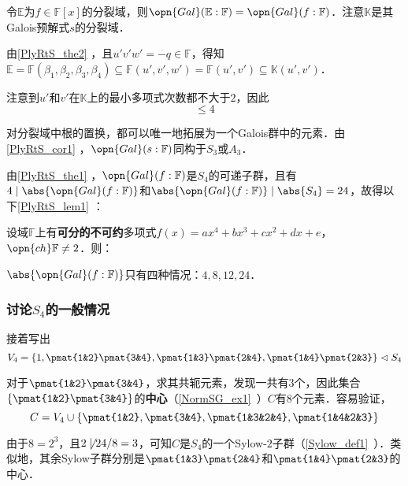 令$\mathbb{E}$为$f\in\mathbb{F}[x]$的分裂域，则$\opn{Gal}(\mathbb{E}:\mathbb{F})=\opn{Gal}(f:\mathbb{F})$．注意$\mathbb{K}$是其Galois预解式$s$的分裂域．

由\autoref{PlyRtS_the2} ，且$u'v'w'=-q\in\mathbb{F}$，得知$\mathbb{E}=\mathbb{F}(\beta_1, \beta_2, \beta_3, \beta_4)\subseteq\mathbb{F}(u', v', w')=\mathbb{F}(u', v')\subseteq\mathbb{K}(u', v')$．

注意到$u'$和$v'$在$\mathbb{K}$上的最小多项式次数都不大于$2$，因此
\begin{equation}
[\mathbb{E}:\mathbb{K}]\leq 4
\end{equation}

对分裂域中根的置换，都可以唯一地拓展为一个Galois群中的元素．由\autoref{PlyRtS_cor1} ，$\opn{Gal}(s:\mathbb{F})$同构于$S_3$或$A_3$．

由\autoref{PlyRtS_the1} ，$\opn{Gal}(f:\mathbb{F})$是$S_4$的可递子群，且有$4\mid\abs{\opn{Gal}(f:\mathbb{F})}$和$\abs{\opn{Gal}(f:\mathbb{F})}\mid \abs{S_4}=24$，故得以下\autoref{PlyRtS_lem1} ：

\begin{lemma}{}\label{PlyRtS_lem1}
设域$\mathbb{F}$上有\textbf{可分的不可约}多项式$f(x)=ax^4+bx^3+cx^2+dx+e$，$\opn{ch}\mathbb{F}\neq 2$．则：

$\abs{\opn{Gal}(f:\mathbb{F})}$只有四种情况：$4, 8, 12, 24$．
\end{lemma}



\subsubsection{讨论$S_4$的一般情况}




接着写出
\begin{equation}
V_4=\{1, \pmat{1&2}\pmat{3&4}, \pmat{1&3}\pmat{2&4}, \pmat{1&4}\pmat{2&3}\}\vartriangleleft S_4
\end{equation}

对于$\pmat{1&2}\pmat{3&4}$，求其共轭元素，发现一共有$3$个，因此集合$\{\pmat{1&2}\pmat{3&4}\}$的\textbf{中心}（\autoref{NormSG_ex1}~）$C$有$8$个元素．容易验证，
\begin{equation}\label{PlyRtS_eq10}
C = V_4\cup\{\pmat{1&2}, \pmat{3&4}, \pmat{1&3&2&4}, \pmat{1&4&2&3}\}
\end{equation}

由于$8=2^3$，且$2\not\mid 24/8=3$，可知$C$是$S_4$的一个Sylow-$2$子群（\autoref{Sylow_def1}~）．类似地，其余Sylow子群分别是$\pmat{1&3}\pmat{2&4}$和$\pmat{1&4}\pmat{2&3}$的中心．

